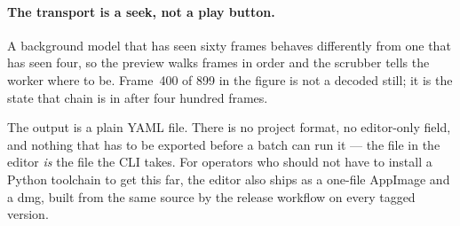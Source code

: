 \paragraph{The transport is a seek, not a play button.} A background model that
has seen sixty frames behaves differently from one that has seen four, so the
preview walks frames in order and the scrubber tells the worker where to be.
Frame~400 of 899 in the figure is not a decoded still; it is the state that chain
is in after four hundred frames.

The output is a plain YAML file. There is no project format, no editor-only
field, and nothing that has to be exported before a batch can run it --- the file
in the editor \emph{is} the file the CLI takes. For operators who should not have
to install a Python toolchain to get this far, the editor also ships as a
one-file AppImage and a dmg, built from the same source by the release workflow
on every tagged version.
